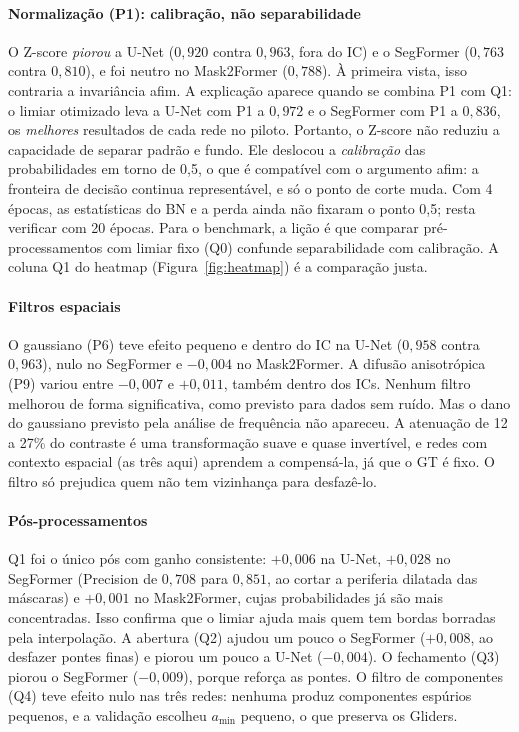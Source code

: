 \paragraph{Normalização (P1): calibração, não separabilidade} O Z-score \emph{piorou} a U-Net
($0{,}920$ contra $0{,}963$, fora do IC) e o SegFormer ($0{,}763$ contra $0{,}810$), e foi neutro no
Mask2Former ($0{,}788$). À primeira vista, isso contraria a invariância afim. A explicação aparece
quando se combina P1 com Q1: o limiar otimizado leva a U-Net com P1 a $0{,}972$ e o SegFormer com
P1 a $0{,}836$, os \emph{melhores} resultados de cada rede no piloto. Portanto, o Z-score não reduziu
a capacidade de separar padrão e fundo. Ele deslocou a \emph{calibração} das probabilidades em torno
de 0,5, o que é compatível com o argumento afim: a fronteira de decisão continua representável, e só
o ponto de corte muda. Com 4 épocas, as estatísticas do BN e a perda ainda não fixaram o ponto 0,5;
resta verificar com 20 épocas. Para o benchmark, a lição é que comparar pré-processamentos com
limiar fixo (Q0) confunde separabilidade com calibração. A coluna Q1 do
heatmap (Figura~\ref{fig:heatmap}) é a comparação justa.

\paragraph{Filtros espaciais} O gaussiano (P6) teve efeito pequeno e dentro do IC na U-Net
($0{,}958$ contra $0{,}963$), nulo no SegFormer e $-0{,}004$ no Mask2Former. A difusão anisotrópica
(P9) variou entre $-0{,}007$ e $+0{,}011$, também dentro dos ICs. Nenhum filtro melhorou de forma
significativa, como previsto para dados sem ruído. Mas o dano do gaussiano previsto pela análise de
frequência não apareceu. A atenuação de 12 a 27\% do contraste é uma transformação suave e quase
invertível, e redes com contexto espacial (as três aqui) aprendem a compensá-la, já que o GT é fixo.
O filtro só prejudica quem não tem vizinhança para desfazê-lo.

\paragraph{Pós-processamentos} Q1 foi o único pós com ganho consistente: $+0{,}006$ na U-Net,
$+0{,}028$ no SegFormer (Precision de $0{,}708$ para $0{,}851$, ao cortar a periferia dilatada das
máscaras) e $+0{,}001$ no Mask2Former, cujas probabilidades já são mais concentradas. Isso confirma
que o limiar ajuda mais quem tem bordas borradas pela interpolação. A abertura (Q2) ajudou um pouco o
SegFormer ($+0{,}008$, ao desfazer pontes finas) e piorou um pouco a U-Net ($-0{,}004$). O fechamento
(Q3) piorou o SegFormer ($-0{,}009$), porque reforça as pontes. O filtro de componentes (Q4) teve
efeito nulo nas três redes: nenhuma produz componentes espúrios pequenos, e a validação escolheu
$a_{\min}$ pequeno, o que preserva os Gliders.

